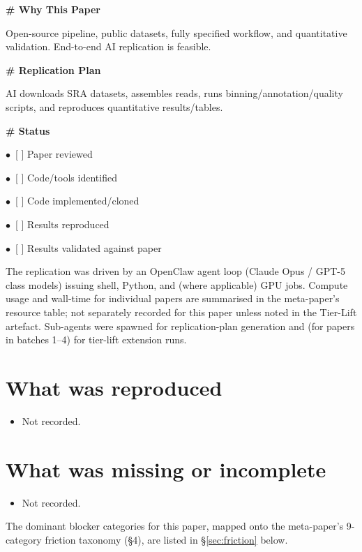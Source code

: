 \documentclass[11pt]{article}
\begin{document}
\par\medskip\textbf{\# Why This Paper}\par
Open-source pipeline, public datasets, fully specified workflow, and quantitative validation. End-to-end AI replication is feasible.

\par\medskip\textbf{\# Replication Plan}\par
AI downloads SRA datasets, assembles reads, runs binning/annotation/quality scripts, and reproduces quantitative results/tables.

\par\medskip\textbf{\# Status}\par
\par$\bullet$\ [ ] Paper reviewed
\par$\bullet$\ [ ] Code/tools identified
\par$\bullet$\ [ ] Code implemented/cloned
\par$\bullet$\ [ ] Results reproduced
\par$\bullet$\ [ ] Results validated against paper
\normalsize

The replication was driven by an OpenClaw agent loop (Claude Opus / GPT-5 class models) issuing shell, Python, and (where applicable) GPU jobs. Compute usage and wall-time for individual papers are summarised in the meta-paper's resource table; not separately recorded for this paper unless noted in the Tier-Lift artefact. Sub-agents were spawned for replication-plan generation and (for papers in batches 1--4) for tier-lift extension runs.

\section{What was reproduced}
\begin{itemize}
\item Not recorded.
\end{itemize}

\section{What was missing or incomplete}
\begin{itemize}
\item Not recorded.
\end{itemize}
The dominant blocker categories for this paper, mapped onto the meta-paper's 9-category friction taxonomy (\S4), are listed in \S\ref{sec:friction} below.
\end{document}
